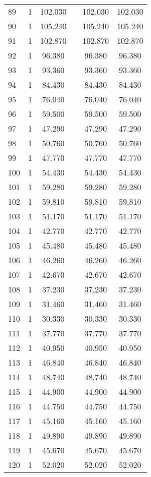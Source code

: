 \begin{table}[!htbp]
\begin{tabular}{@{\extracolsep{5pt}}lccccc}
89 & 1 & 102.030 &  & 102.030 & 102.030 \\ 
90 & 1 & 105.240 &  & 105.240 & 105.240 \\ 
91 & 1 & 102.870 &  & 102.870 & 102.870 \\ 
92 & 1 & 96.380 &  & 96.380 & 96.380 \\ 
93 & 1 & 93.360 &  & 93.360 & 93.360 \\ 
94 & 1 & 84.430 &  & 84.430 & 84.430 \\ 
95 & 1 & 76.040 &  & 76.040 & 76.040 \\ 
96 & 1 & 59.500 &  & 59.500 & 59.500 \\ 
97 & 1 & 47.290 &  & 47.290 & 47.290 \\ 
98 & 1 & 50.760 &  & 50.760 & 50.760 \\ 
99 & 1 & 47.770 &  & 47.770 & 47.770 \\ 
100 & 1 & 54.430 &  & 54.430 & 54.430 \\ 
101 & 1 & 59.280 &  & 59.280 & 59.280 \\ 
102 & 1 & 59.810 &  & 59.810 & 59.810 \\ 
103 & 1 & 51.170 &  & 51.170 & 51.170 \\ 
104 & 1 & 42.770 &  & 42.770 & 42.770 \\ 
105 & 1 & 45.480 &  & 45.480 & 45.480 \\ 
106 & 1 & 46.260 &  & 46.260 & 46.260 \\ 
107 & 1 & 42.670 &  & 42.670 & 42.670 \\ 
108 & 1 & 37.230 &  & 37.230 & 37.230 \\ 
109 & 1 & 31.460 &  & 31.460 & 31.460 \\ 
110 & 1 & 30.330 &  & 30.330 & 30.330 \\ 
111 & 1 & 37.770 &  & 37.770 & 37.770 \\ 
112 & 1 & 40.950 &  & 40.950 & 40.950 \\ 
113 & 1 & 46.840 &  & 46.840 & 46.840 \\ 
114 & 1 & 48.740 &  & 48.740 & 48.740 \\ 
115 & 1 & 44.900 &  & 44.900 & 44.900 \\ 
116 & 1 & 44.750 &  & 44.750 & 44.750 \\ 
117 & 1 & 45.160 &  & 45.160 & 45.160 \\ 
118 & 1 & 49.890 &  & 49.890 & 49.890 \\ 
119 & 1 & 45.670 &  & 45.670 & 45.670 \\ 
120 & 1 & 52.020 &  & 52.020 & 52.020 \\ 

\end{tabular}
\end{table}

